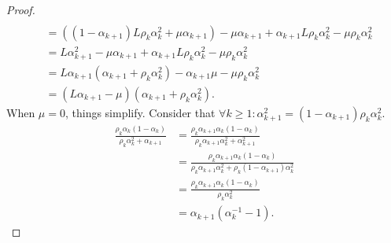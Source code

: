 \documentclass[12pt]{article}
\begin{document}
\begin{proof}
\begin{align*}
            \\
            &= 
            ((1 - \alpha_{k + 1})L \rho_k \alpha_k^2 + \mu \alpha_{k + 1}) - \mu\alpha_{k + 1} + \alpha_{k + 1} L \rho_k \alpha_k^2 - \mu \rho_k \alpha_k^2
            \\
            &= L \alpha_{k + 1}^2 - \mu\alpha_{k + 1} + \alpha_{k + 1}L\rho_k\alpha_k^2 - \mu \rho_k \alpha_k^2
            \\
            &= 
            L\alpha_{k + 1}(\alpha_{k + 1} + \rho_k \alpha_k^2) - \alpha_{k + 1}\mu - \mu \rho_k \alpha_k^2
            \\
            &= (L \alpha_{k + 1} - \mu)(\alpha_{k + 1} + \rho_k \alpha_k^2). 
        \end{align*}
        When $\mu = 0$, things simplify. 
        Consider that $\forall k \ge 1: \alpha_{k + 1}^2 = (1 - \alpha_{k + 1})\rho_k\alpha_k^2$. 
        \begin{align*}
            \frac{\rho_k\alpha_k(1 - \alpha_k)}{\rho_k\alpha_k^2 + \alpha_{k + 1}}
            &= 
            \frac{\rho_k\alpha_{k + 1}\alpha_k(1 - \alpha_k)}
            {\rho_k\alpha_{k + 1}\alpha_k^2 + \alpha_{k + 1}^2}
            \\
            &= 
            \frac{\rho_k\alpha_{k + 1}\alpha_k(1 - \alpha_k)}
            {\rho_k\alpha_{k + 1}\alpha_k^2 + \rho_k(1 - \alpha_{k + 1})\alpha_k^2}
            \\
            &= \frac{\rho_k\alpha_{k + 1}\alpha_k(1 - \alpha_k)}{\rho_k\alpha_k^2}
            \\
            &= \alpha_{k + 1}(\alpha_k^{-1} - 1). 
        \end{align*}
    \end{proof}
\end{document}
